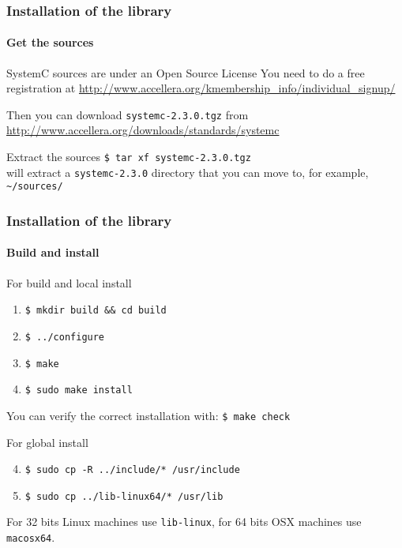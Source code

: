 \begin{frame}
\frametitle{Installation of the library}
\framesubtitle{Get the sources}

\begin{block}{SystemC sources are under an Open Source License}
You need to do a free registration at 
{ \scriptsize
\url{http://www.accellera.org/kmembership_info/individual_signup/}
}

\medskip 
Then you can download \texttt{systemc-2.3.0.tgz} from 
{ \scriptsize
\url{http://www.accellera.org/downloads/standards/systemc}
}
\end{block}
\begin{block}{Extract the sources}
\texttt{\$ tar xf systemc-2.3.0.tgz} \\
will extract a \texttt{systemc-2.3.0} directory that you can move to, for example,
\texttt{\textasciitilde{}/sources/}
\end{block}

\end{frame}

\begin{frame}
\frametitle{Installation of the library}
\framesubtitle{Build and install}

\begin{block}{For build and local install}
\begin{enumerate}
\item \texttt{\$ mkdir build \&\& cd build}
\item \texttt{\$ ../configure}
\item \texttt{\$ make}
\item \texttt{\$ sudo make install}
\end{enumerate}
You can verify the correct installation with: \texttt{\$ make check}
\end{block}
\pause
\begin{block}{For global install}
\begin{enumerate}
\setcounter{enumi}{3}
\item \texttt{\$ sudo cp -R ../include/* /usr/include}
\item \texttt{\$ sudo cp ../lib-linux64/* /usr/lib}
\end{enumerate}
For 32 bits Linux machines use \texttt{lib-linux}, for 64 bits OSX machines use \texttt{macosx64}.
\end{block}

\end{frame}

